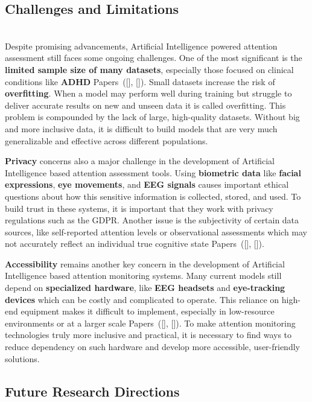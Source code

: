 \documentclass[12pt]{article}
\begin{document}
\subsection{ Challenges and Limitations} \\ 

Despite promising advancements, Artificial Intelligence powered attention assessment still faces some ongoing challenges. One of the most significant is the \textbf{limited sample size of many datasets}, especially those focused on clinical conditions like \textbf{ADHD} Papers~([\citealp{ref11}], [\citealp{ref13}]). Small datasets increase the risk of \textbf{overfitting}. When a model may perform well during training but struggle to deliver accurate results on new and unseen data it is called overfitting. This problem is compounded by the lack of large, high-quality datasets. Without big and more inclusive data, it is difficult to build models that are very much generalizable and effective across different populations.

\textbf{Privacy} concerns also a major challenge in the development of Artificial Intelligence based attention assessment tools. Using \textbf{biometric data} like \textbf{facial expressions}, \textbf{eye movements}, and \textbf{EEG signals} causes important ethical questions about how this sensitive information is collected, stored, and used. To build trust in these systems, it is important that they work with privacy regulations such as the GDPR. Another issue is the subjectivity of certain data sources, like self-reported attention levels or observational assessments which may not accurately reflect an individual true cognitive state Papers~([\citealp{ref5}], [\citealp{ref6}]).

\textbf{Accessibility} remains another key concern in the development of Artificial Intelligence based attention monitoring systems. Many current models still depend on \textbf{specialized hardware}, like \textbf{EEG headsets} and \textbf{eye-tracking devices} which can be costly and complicated to operate. This reliance on high-end equipment makes it difficult to implement, especially in low-resource environments or at a larger scale Papers~([\citealp{ref8}], [\citealp{ref14}]). To make attention monitoring technologies truly more inclusive and practical, it is necessary to find ways to reduce dependency on such hardware and develop more accessible, user-friendly solutions.

\subsection{ Future Research Directions} \\
\end{document}
